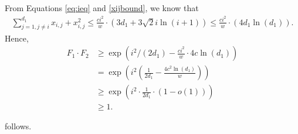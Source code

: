 \documentclass[10pt,a4paper]{article}
\newcommand{\<}{\langle}
\renewcommand{\>}{\rangle}
\begin{document}
From Equations \eqref{eq:ieq} and \eqref{xijbound}, we know that
\begin{align*}
\sum_{j=1, j\neq i}^{d_1} x_{i,j} + x_{i, j}^2 \leq \frac{c i^2}{w} \cdot
\left(3d_1 + 3 \sqrt{2} i \ln(i+1)\right) \leq \frac{ci^2}{w} \cdot \left(4
d_1 \ln(d_1)\right).
\end{align*}
Hence,
\begin{align*}
F_1 \cdot F_2 & \geq \exp\left(i^2/(2d_1) - \frac{ci^2}{w} \cdot 4 c
\ln(d_1)\right) \\
&= \exp\left(i^2 \left(\frac{1}{2d_1} - \frac{4c^2 \ln(d_1)}{w}\right)\right)
\\
& \geq \exp\left(i^2 \cdot \frac{1}{2d_1} \cdot (1-o(1))\right) \\
& \geq 1.
\end{align*}

 follows.



%
\end{document}
